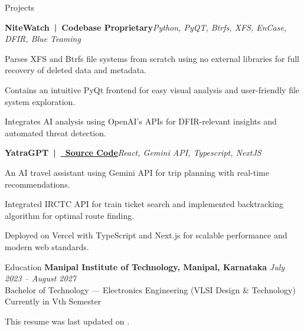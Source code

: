 \documentclass{resume} %
\begin{document}
\begin{rSection}{Projects}

\begin{rSubsection}{\bf NiteWatch~|~Codebase Proprietary}{\em Python, PyQT, Btrfs, XFS, EnCase, DFIR, Blue Teaming}{}{}
\item Parses XFS and Btrfs file systems from scratch using no external libraries for full recovery of deleted data and metadata.
\item Contains an intuitive PyQt frontend for easy visual analysis and user-friendly file system exploration.
\item Integrates AI analysis using OpenAI's APIs for DFIR-relevant insights and automated threat detection.
\end{rSubsection}

\begin{rSubsection}{\bf YatraGPT~|~\href{https://github.com/vee1e/finova}{\faGithub~\underline{Source Code}}}{\em React, Gemini API, Typescript, NextJS}{}{}
\item An AI travel assistant using Gemini API for trip planning with real-time recommendations.
\item Integrated IRCTC API for train ticket search and implemented backtracking algorithm for optimal route finding.
\item Deployed on Vercel with TypeScript and Next.js for scalable performance and modern web standards.
\end{rSubsection}

\end{rSection}

\begin{rSection}{Education}
    {\bf Manipal Institute of Technology, Manipal, Karnataka} \hfill \textit{July 2023 -- August 2027}  \\
    {Bachelor of Technology --- Electronics Engineering (VLSI Design \& Technology)} \hfill Currently in Vth Semester \\
\end{rSection}

\vspace{-0.8em}
\small \begin{center}This resume was last updated on \DTMnow.\\\end{center}
\end{document}
